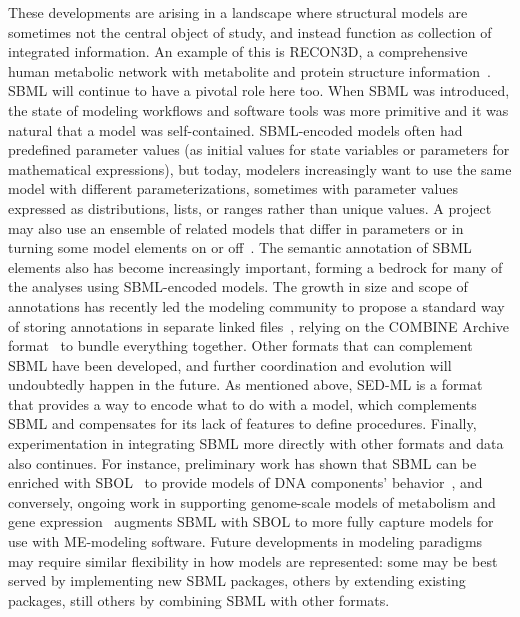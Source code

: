 \documentclass{sbml-paper}
\begin{document}
These developments are arising in a landscape where structural models are sometimes not the central object of study, and instead function as collection of integrated information.  An example of this is RECON3D, a comprehensive human metabolic network with metabolite and protein structure information~\citep{brunk2018}.  SBML will continue to have a pivotal role here too.  When SBML was introduced, the state of modeling workflows and software tools was more primitive and it was natural that a model was self-contained.  SBML-encoded models often had predefined parameter values (\eg as initial values for state variables or parameters for mathematical expressions), but today, modelers increasingly want to use the same model with different parameterizations, sometimes with parameter values expressed as distributions, lists, or ranges rather than unique values.  A project may also use an ensemble of related models that differ in parameters or in turning some model elements on or off~\citep{kuepfer2007ensemble}.  The semantic annotation of SBML elements also has become increasingly important, forming a bedrock for many of the analyses using SBML-encoded models.  The growth in size and scope of annotations has recently led the modeling community to propose a standard way of storing annotations in separate linked files~\citep{Neal2019harmonizing}, relying on the COMBINE Archive format~\citep{bergmann2014combine} to bundle everything together.  Other formats that can complement SBML have been developed, and further coordination and evolution will undoubtedly happen in the future.  As mentioned above, SED-ML is a format that provides a way to encode what to do with a model, which complements SBML and compensates for its lack of features to define procedures.  Finally, experimentation in integrating SBML more directly with other formats and data also continues.  For instance, preliminary work has shown that SBML can be enriched with SBOL~\citep{voigt2018sbmlme} to provide models of DNA components' behavior~\citep{Roehner2014a}, and conversely, ongoing work in supporting genome-scale models of metabolism and gene expression~\citep[known as \emph{ME-models}, ][]{Thiele2012multiscale} augments SBML with SBOL to more fully capture models for use with ME-modeling software.  Future developments in modeling paradigms may require similar flexibility in how models are represented: some may be best served by implementing new SBML packages, others by extending existing packages, still others by combining SBML with other formats.
\end{document}
